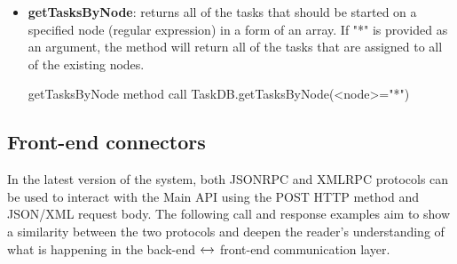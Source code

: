\begin{itemize}
    \item
        \textbf{getTasksByNode}: returns all of the tasks that should be started on a specified node (regular expression) in a form of an array. If "*" is provided as an argument, the method will return all of the tasks that are assigned to all of the existing nodes.
        \begin{sexylisting}[colback=white]{getTasksByNode method call}
TaskDB.getTasksByNode(<node>="*")
        \end{sexylisting}
        
        
\end{itemize}





\subsection{Front-end connectors}
\hspace{0.6cm}

In the latest version of the system, both JSONRPC and XMLRPC protocols can be used to interact with the Main API using the POST HTTP method and JSON/XML request body. The following call and response examples aim to show a similarity between the two protocols and deepen the reader's understanding of what is happening in the back-end $\xleftrightarrow{}$ front-end communication layer.

